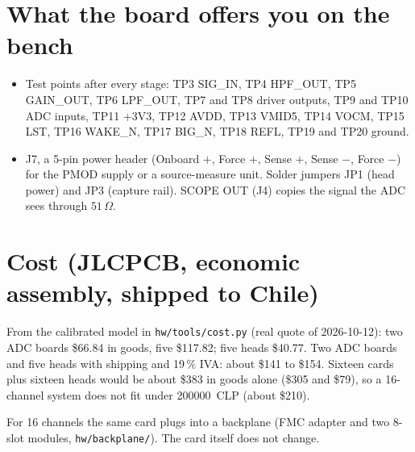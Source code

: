 \documentclass[11pt,a4paper]{article}
\begin{document}
\section{What the board offers you on the bench}
\begin{itemize}[leftmargin=1.2em]
\item Test points after every stage: TP3 SIG\_IN, TP4 HPF\_OUT, TP5 GAIN\_OUT, TP6 LPF\_OUT, TP7 and TP8 driver outputs, TP9 and TP10 ADC inputs, TP11 +3V3, TP12 AVDD, TP13 VMID5, TP14 VOCM, TP15 LST, TP16 WAKE\_N, TP17 BIG\_N, TP18 REFL, TP19 and TP20 ground.
\item J7, a 5-pin power header (Onboard $+$, Force $+$, Sense $+$, Sense $-$, Force $-$) for the PMOD supply or a source-measure unit. Solder jumpers JP1 (head power) and JP3 (capture rail). SCOPE OUT (J4) copies the signal the ADC sees through $51\,\Omega$.
\end{itemize}

\section{Cost (JLCPCB, economic assembly, shipped to Chile)}
From the calibrated model in \texttt{hw/tools/cost.py} (real quote of 2026-10-12): two ADC boards \$66.84 in goods, five \$117.82; five heads \$40.77. Two ADC boards and five heads with shipping and 19\,\% IVA: about \$141 to \$154. Sixteen cards plus sixteen heads would be about \$383 in goods alone (\$305 and \$79), so a 16-channel system does not fit under \SI{200000}{CLP} (about \$210).

\begin{key}
For 16 channels the same card plugs into a backplane (FMC adapter and two 8-slot modules, \texttt{hw/backplane/}). The card itself does not change.
\end{key}
\end{document}
